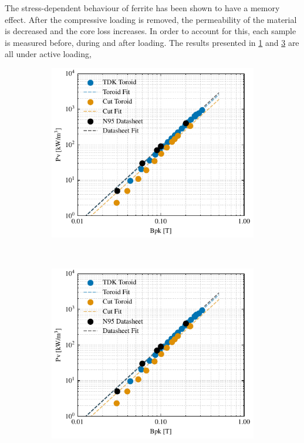 \documentclass[conference]{IEEEtran}
\begin{document}
The stress-dependent behaviour of ferrite has been shown to have a memory effect. 
After the compressive loading is removed, the permeability of the material is decreased and the core loss increases. 
In order to account for this, each sample is measured before, during and after loading. 
The results presented in \cref{fig:BPcurves} and \cref{fig:corelossstress} are all under active loading, 

\begin{figure}[t]
  \centering
  \begin{subfigure}{\columnwidth}
    \centering
    \includegraphics{figures/24-09-10_BP_curves.pdf}
    \caption{}
    \label{fig:BPcurves}
  \end{subfigure}~
  \begin{subfigure}{\columnwidth}
    \centering
    \includegraphics{figures/24-09-10_BP_curves.pdf}
    \caption{}
    \label{fig:corelossstress}
  \end{subfigure}


\end{figure}
\end{document}
